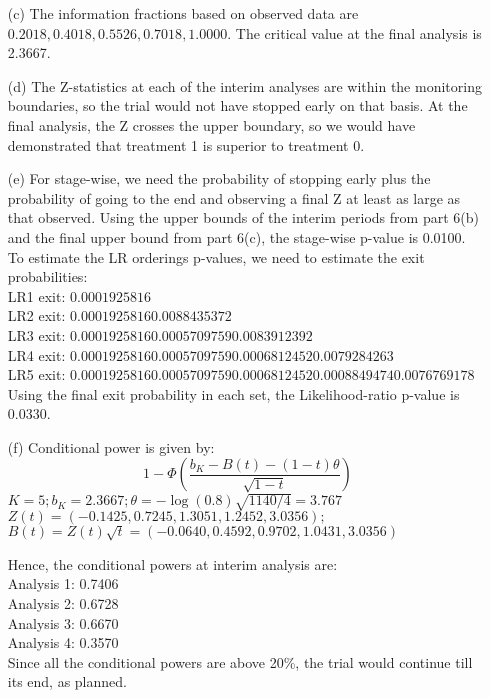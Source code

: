 \documentclass[11pt,a4paper]{article}
\begin{document}
\begin{enumerate}
\begin{enumerate}
\item[(c)] The information fractions based on observed data are $0.2018, 0.4018, 0.5526, 0.7018, 1.0000$. The critical value at the final analysis is 2.3667.

\item[(d)] The Z-statistics at each of the interim analyses are within the monitoring boundaries, so the trial would not have stopped early on that basis. At the final analysis, the Z crosses the upper boundary, so we would have demonstrated that treatment 1 is superior to treatment 0.

\item[(e)] For stage-wise, we need the probability of stopping early plus the probability of going to the end and observing a final Z at least as large as that observed. Using the upper bounds of the interim periods from part 6(b) and the final upper bound from part 6(c), the stage-wise p-value is 0.0100. \\

To estimate the LR orderings p-values, we need to estimate the exit probabilities: \\
LR1 exit: $0.0001925816$\\
LR2 exit: $0.0001925816 0.0088435372$\\
LR3 exit: $0.0001925816 0.0005709759 0.0083912392$\\
LR4 exit: $0.0001925816 0.0005709759 0.0006812452 0.0079284263$\\
LR5 exit: $0.0001925816 0.0005709759 0.0006812452 0.0008849474 0.0076769178$\\
Using the final exit probability in each set, the Likelihood-ratio p-value is 0.0330. 

\item[(f)] Conditional power is given by:
\[ 1-\Phi \left(\dfrac{b_K-B(t)-(1-t)\theta}{\sqrt{1-t}}\right) \]
$K = 5; b_K = 2.3667; \theta = -\log(0.8)\sqrt{1140/4} = 3.767$ \\ 
$Z(t) = (-0.1425, 0.7245, 1.3051, 1.2452, 3.0356);$ \\
$B(t) = Z(t)\sqrt{t} = (-0.0640, 0.4592, 0.9702, 1.0431, 3.0356) $

Hence, the conditional powers at interim analysis are: \\
Analysis 1: 0.7406 \\
Analysis 2: 0.6728 \\
Analysis 3: 0.6670 \\
Analysis 4: 0.3570 \\

Since all the conditional powers are above 20\%, the trial would continue till its end, as planned. 

\end{enumerate}

\end{enumerate}

 

\end{document}

